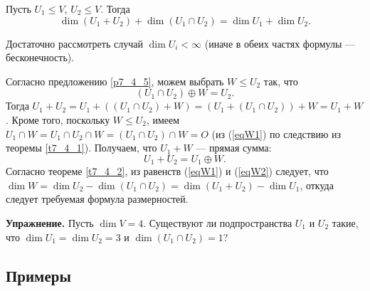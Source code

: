 \begin{theor}\label{t7_4_3}
Пусть $U_1\leq V$, $U_2\leq V$.
Тогда 
$$\boxed{\dim (U_1+U_2) + \dim (U_1\cap U_2)= \dim U_1+ \dim U_2}.$$
\end{theor}
\dok Достаточно рассмотреть случай $\dim U_i<\infty $ (иначе в обеих частях формулы --- бесконечность).

Согласно предложению \ref{p7_4_5}, можем выбрать  $W\leq U_2$ так, что 
\begin{equation}\label{eqW1}
(U_1\cap U_2)\oplus W = U_2.
\end{equation}
Тогда  $U_1+U_2 = U_1+ ((U_1\cap U_2) +  W) = (U_1+ (U_1\cap U_2)) +  W = U_1+W $.
Кроме того, поскольку $W\leq U_2$, имеем  $U_1\cap W = U_1\cap U_2 \cap W = (U_1\cap U_2) \cap W = O$
(из (\ref{eqW1}) по следствию из теоремы \ref{t7_4_1}). Получаем, что $U_1+W $ --- прямая сумма:
\begin{equation}\label{eqW2}
U_1+  U_2 = U_1 \oplus W.
\end{equation}
 Согласно %
теореме \ref{t7_4_2}, из равенств (\ref{eqW1}) и (\ref{eqW2}) следует, что \\
$\dim W = \dim U_2 - \dim (U_1\cap U_2) = \dim (U_1+ U_2) - \dim U_1$, откуда следует требуемая формула размерностей.
\edok

\otstup 
{\bf Упражнение.} Пусть $\dim V=4$. Существуют ли подпространства $U_1$ и $U_2$ такие, что 
$\dim U_1 = \dim U_2 = 3$ и $\dim (U_1\cap U_2)=1$?

\subsection{Примеры}



